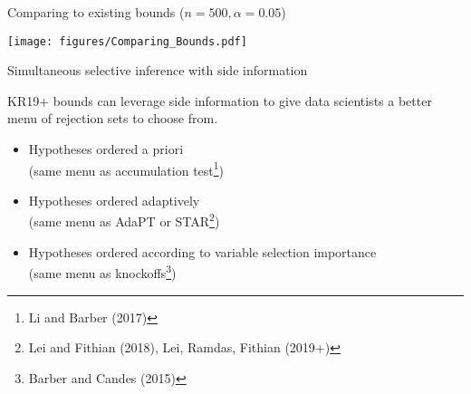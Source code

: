 \documentclass{beamer}
\begin{document}
%
%
%
%
%

\begin{frame}{Comparing to existing bounds ($n = 500, \alpha = 0.05$)}

\begin{center}
	\texttt{[image: figures/Comparing\_Bounds.pdf]}
\end{center}

\end{frame}

\begin{frame}{Simultaneous selective inference with side information}
	
KR19+ bounds can leverage side information to give data scientists a better menu of rejection sets to choose from. 

\begin{itemize}
	\item Hypotheses ordered a priori \\ (same menu as accumulation test\footnote{Li and Barber (2017)})
	\item Hypotheses ordered adaptively \\ (same menu as AdaPT or STAR\footnote{Lei and Fithian (2018), Lei, Ramdas, Fithian (2019+)})
	\item Hypotheses ordered according to variable selection importance \\ (same menu as knockoffs\footnote{Barber and Candes (2015)})
\end{itemize}

\end{frame}
\end{document}
